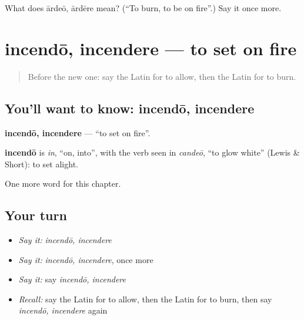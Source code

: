 \begin{tcolorbox}[breakable,colback=teal!4,colframe=teal!35!black,title={Before you move on}]
What does ārdeō, ārdēre mean? (\textquotedblleft{}To burn, to be on fire\textquotedblright{}.) Say it once more.
\end{tcolorbox}
\section[incendō, incendere]{incendō, incendere — to set on fire}

\label{lesson:LA-C167-incendo}



\begin{quote}
Before the new one: say the Latin for to allow, then the Latin for to burn.
\end{quote}

\subsection*{You'll want to know: incendō, incendere}
\textbf{incendō, incendere} — \textquotedblleft{}to set on fire\textquotedblright{}.

\begin{cousinweb}
\textbf{incendō} is \emph{in}, \textquotedblleft{}on, into\textquotedblright{}, with the verb seen in \emph{candeō}, \textquotedblleft{}to glow white\textquotedblright{} (Lewis \& Short): to set alight.
\end{cousinweb}

\begin{grammarlens}[title={What you've built}]
One more word for this chapter.
\end{grammarlens}

\subsection*{Your turn}
\begin{itemize}
\raggedright
  \item \emph{Say it:} \emph{incendō, incendere}
  \item \emph{Say it:} \emph{incendō, incendere}, once more
  \item \emph{Say it:} say \emph{incendō, incendere}
  \item \emph{Recall:} say the Latin for to allow, then the Latin for to burn, then say \emph{incendō, incendere} again
\end{itemize}

